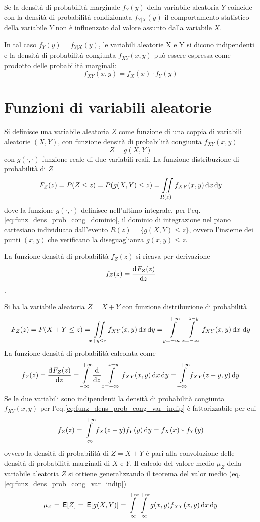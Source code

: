 Se la densità di probabilità marginale $f_Y(y)$ della variabile aleatoria $Y$ coincide con la densità di probabilità condizionata $f_{Y|X}(y)$ il comportamento statistico della variabile $Y$ non è influenzato dal valore assunto dalla variabile $X$. 

In tal caso $f_Y(y)=f_{Y|X}(y)$, le variabili aleatorie X e Y si dicono indipendenti e la densità di probabilità congiunta $f_{XY}(x,y)$ può essere espressa come prodotto delle probabilità marginali:
\begin{equation}\label{eq:funz_dens_prob_cong_var_indip}
f_{XY}(x,y)=f_X(x)\cdot f_Y(y)
\end{equation}

\clearpage
\section{Funzioni di variabili aleatorie}
Si definisce una variabile aleatoria $Z$ come funzione di una coppia di variabili aleatorie $(X,Y)$, con funzione densità di probabilità congiunta $f_{XY}(x,y)$
\[Z=g(X,Y)\]
con $g(\cdot,\cdot)$ funzione reale di due variabili reali. La funzione distribuzione di probabilità di $Z$
\[F_Z(z)=P(Z\leq z)=P(g(X,Y)\leq z)=\iint\limits_{R(z)}{f_{XY}(x,y)\mathop{}\!\mathrm{d} x \mathop{}\!\mathrm{d} y}\]
dove la funzione $g(\cdot,\cdot)$ definisce nell'ultimo integrale, per l'eq.\ref{eq:funz_dens_prob_cong_dominio}, il dominio di integrazione nel piano cartesiano individuato dall'evento $R(z)=\{g(X,Y)\leq z\}$, ovvero l'insieme dei punti $(x,y)$ che verificano la diseguaglianza $g(x,y)\leq z$.

La funzione densità di probabilità $f_Z(z)$ si ricava per derivazione
\[f_Z(z)=\dfrac{\mathop{}\!\mathrm{d}^{}F_Z(z)}{\mathop{}\!\mathrm{d} z^{}}\].

\begin{esempio}
Si ha la variabile aleatoria $Z=X+Y$ con funzione distribuzione di probabilità
\[F_Z(z)=P(X+Y\leq z)=\iint\limits_{x+y\leq z}{f_{XY}(x,y)\mathop{}\!\mathrm{d} x \mathop{}\!\mathrm{d} y}=\int\limits_{y=-\infty}^{+\infty}\int\limits_{x=-\infty}^{z-y}{f_{XY}(x,y)}{\,\mathop{}\!\mathrm{d} x\,\mathop{}\!\mathrm{d} y}\]
La funzione densità di probabilità calcolata come \[f_Z(z)=\dfrac{\mathop{}\!\mathrm{d}^{}F_Z(z)}{\mathop{}\!\mathrm{d} z^{}}=\int\limits_{-\infty}^{+\infty}{\dfrac{\mathop{}\!\mathrm{d}^{}}{\mathop{}\!\mathrm{d} z^{}}\int\limits_{x=-\infty}^{z-y}{f_{XY}(x,y)}{\,\mathop{}\!\mathrm{d}{x}}}{\,\mathop{}\!\mathrm{d}{y}}=\int\limits_{-\infty}^{+\infty}{f_{XY}(z-y,y)}{\,\mathop{}\!\mathrm{d}{y}}\]
Se le due variabili sono indipendenti la densità di probabilità congiunta $f_{XY}(x,y)$ per l'eq.\ref{eq:funz_dens_prob_cong_var_indip} è fattorizzabile per cui
\[f_Z(z)=\int\limits_{-\infty}^{+\infty}{f_X(z-y)f_Y(y)}{\,\mathop{}\!\mathrm{d}{y}}=f_X(x)\ast f_Y(y)\]
ovvero la densità di probabilità di $Z=X+Y$ è pari alla convoluzione delle densità di probabilità marginali di $X$ e $Y$.
Il calcolo del valore medio $\mu_Z$ della variabile aleatoria $Z$ si ottiene generalizzando il teorema del valor medio (eq.\ref{eq:funz_dens_prob_cong_var_indip})
\[\mu_Z=\,{\operatorname{\mathsf{E}}}\!\left[{Z}\right]=\,{\operatorname{\mathsf{E}}}\!\left[{g(X,Y)}\right]=\int\limits_{-\infty}^{+\infty}{\int\limits_{-\infty}^{+\infty}{g(x,y)f_{XY}(x,y)}{\,\mathop{}\!\mathrm{d}{x}}}{\,\mathop{}\!\mathrm{d}{y}}\]
\end{esempio}

